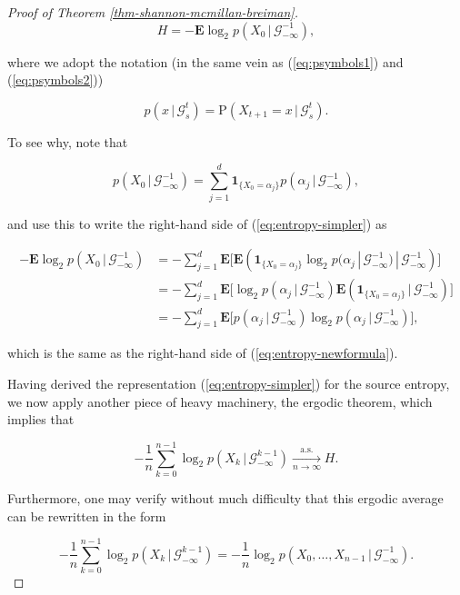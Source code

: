 \documentclass[11pt]{report}
\theoremstyle{plain}
\theoremstyle{definition}
\begin{document}
\begin{proof}[Proof of Theorem \ref{thm-shannon-mcmillan-breiman}]
\begin{equation*} \tag{36}\label{eq:entropy-simpler}
H = -\mathbf{E} \log_2 p(X_0\,|\,\mathcal{G}_{-\infty}^{-1}),
\end{equation*}

where we adopt the notation (in the same vein as (\ref{eq:psymbols1}) and (\ref{eq:psymbols2}))

\begin{equation*} \tag{37}\label{eq:psymbols-generalized}
p(x\,|\,\mathcal{G}_s^t) = \mathrm{P}\left(X_{t+1}=x\,|\,\mathcal{G}_s^t\right).
\end{equation*}

To see why, note that

\[
p(X_0\,|\,\mathcal{G}_{-\infty}^{-1}) = \sum_{j=1}^d \mathbf{1}_{\{X_0=\alpha_j\}} p(\alpha_j\,|\,\mathcal{G}_{-\infty}^{-1}),
\]

and use this to write the right-hand side of (\ref{eq:entropy-simpler}) as

\begin{align*}
-\mathbf{E} \log_2 p(X_0\,|\,\mathcal{G}_{-\infty}^{-1})
&=
-\sum_{j=1}^d \mathbf{E}\Big[
\mathbf{E}\left(
\mathbf{1}_{\{X_0=\alpha_j\}}
\log_2 p(\alpha_j\,|\,\mathcal{G}_{-\infty}^{-1})
\,|\,\mathcal{G}_{-\infty}^{-1}\right)
\Big] \\
&= -\sum_{j=1}^d \mathbf{E}\Big[ \log_2 p(\alpha_j\,|\,\mathcal{G}_{-\infty}^{-1})
\mathbf{E}\left(\mathbf{1}_{\{X_0=\alpha_j\}}\,|\,\mathcal{G}_{-\infty}^{-1}\right)
\Big] \\
&= -\sum_{j=1}^d \mathbf{E}\Big[
p(\alpha_j\,|\,\mathcal{G}_{-\infty}^{-1})
\log_2 p(\alpha_j\,|\,\mathcal{G}_{-\infty}^{-1})
\Big],
\end{align*}

which is the same as the right-hand side of (\ref{eq:entropy-newformula}).

Having derived the representation (\ref{eq:entropy-simpler}) for the source entropy, we now apply another piece of heavy machinery, the ergodic theorem, which implies that

\[
-\frac{1}{n} \sum_{k=0}^{n-1} \log_2 p(X_k\,|\,\mathcal{G}_{-\infty}^{k-1}) \xrightarrow[n\to\infty]{\textrm{a.s.}} H.
\]

Furthermore, one may verify without much difficulty that this ergodic average can be rewritten in the form

\begin{equation*} \tag{38}\label{eq:aep-ergodic-average1}
-\frac{1}{n} \sum_{k=0}^{n-1} \log_2 p(X_k\,|\,\mathcal{G}_{-\infty}^{k-1}) = -\frac{1}{n} \log_2 p(X_0,\ldots,X_{n-1}\,|\,\mathcal{G}_{-\infty}^{-1}).
\end{equation*}


\end{proof}
\end{document}
